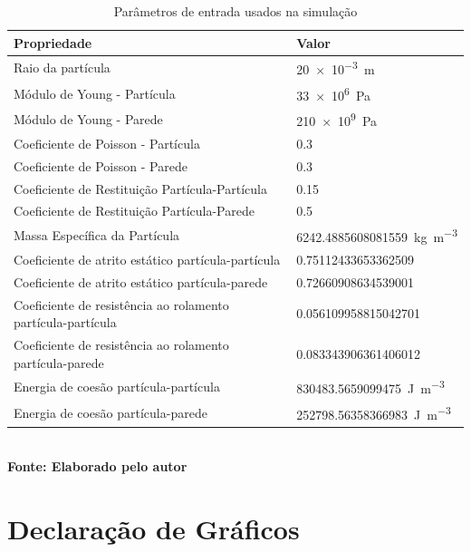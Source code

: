 		\begin{table}[!ht]
			\centering
			\caption{\hspace{0.1cm} Parâmetros de entrada usados na simulação}
			\vspace{-0.3cm} %
			\begin{tabular}{l|l}
				\hline
				\textbf{Propriedade} & \textbf{Valor} \\
				\hline
					Raio da partícula & \SI[{scientific-notation = engineering}]{20e-3}{\meter} \\
					Módulo de Young - Partícula & \SI[{scientific-notation = engineering}]{33e6}{\Pa} \\
					Módulo de Young - Parede & \SI[{scientific-notation = engineering}]{210e9}{\Pa} \\
					Coeficiente de Poisson - Partícula & \num{0.3} \\
					Coeficiente de Poisson - Parede & \num{0.3} \\
					Coeficiente de Restituição Partícula-Partícula & \num{0.15} \\
					Coeficiente de Restituição Partícula-Parede & \num{0.5} \\
					Massa Específica da Partícula & \SI[{scientific-notation = engineering}]{6242.4885608081559}{\kilogram \per \meter^3} \\
					Coeficiente de atrito estático partícula-partícula & \num{0.75112433653362509} \\
					Coeficiente de atrito estático partícula-parede & \num{0.72660908634539001} \\
					Coeficiente de resistência ao rolamento partícula-partícula & \num{0.056109958815042701} \\
					Coeficiente de resistência ao rolamento partícula-parede & \num{0.083343906361406012} \\
					Energia de coesão partícula-partícula & \SI[{scientific-notation = engineering}]{830483.5659099475}{\joule \per \meter^3} \\
					Energia de coesão partícula-parede & \SI[{scientific-notation = engineering}]{252798.56358366983}{\joule \per \meter^3} \\
				\hline
			\end{tabular}
			\\
			\small{\textbf{\footnotesize Fonte: Elaborado pelo autor}}
			\label{tab3}
		\end{table}
		
	\section{\esp Declaração de Gráficos}\label{section:2.1}
		
